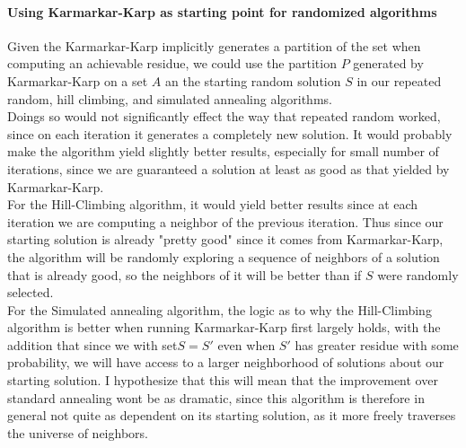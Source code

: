 \documentclass[10.5pt,letter]{article}
\begin{document}
\paragraph{Using Karmarkar-Karp as starting point for randomized algorithms} Given the Karmarkar-Karp implicitly generates a partition of the set when computing an achievable residue, we could use the partition $P$ generated by Karmarkar-Karp on a set $A$ an the starting random solution $S$ in our repeated random, hill climbing, and simulated annealing algorithms.\\
Doings so would not significantly effect the way that repeated random worked, since on each iteration it generates a completely new solution. It would probably make the algorithm yield slightly better results, especially for small number of iterations, since we are guaranteed a solution at least as good as that yielded by Karmarkar-Karp. \\
For the Hill-Climbing algorithm, it would yield better results since at each iteration we are computing a neighbor of the previous iteration. Thus since our starting solution is already "pretty good" since it comes from Karmarkar-Karp, the algorithm will be randomly exploring a sequence of neighbors of a solution that is already good, so the neighbors of it will be better than if $S$ were randomly selected. \\
For the Simulated annealing algorithm, the logic as to why the Hill-Climbing algorithm is better when running Karmarkar-Karp first largely holds, with the addition that since we with set$S=S'$ even when $S'$ has greater residue with some probability, we will have access to a larger neighborhood of solutions about our starting solution. I hypothesize that this will mean that the improvement over standard annealing wont be as dramatic, since this algorithm is therefore in general not quite as dependent on its starting solution, as it more freely traverses the universe of neighbors.
\end{document}
